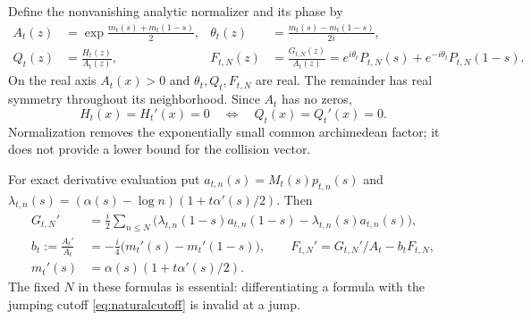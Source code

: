 \documentclass[11pt]{article}
\numberwithin{equation}{section}
\theoremstyle{definition}
\theoremstyle{remark}
\begin{document}
Define the nonvanishing analytic normalizer and its phase by
\begin{align}\label{eq:symmetricnormalization}
 A_t(z)&=\exp\frac{m_t(s)+m_t(1-s)}2,&
 \theta_t(z)&=\frac{m_t(s)-m_t(1-s)}{2i},\\
 Q_t(z)&=\frac{H_t(z)}{A_t(z)},&
 F_{t,N}(z)&=\frac{G_{t,N}(z)}{A_t(z)}
 =e^{i\theta_t}P_{t,N}(s)+e^{-i\theta_t}P_{t,N}(1-s).\nonumber
\end{align}
On the real axis $A_t(x)>0$ and $\theta_t,Q_t,F_{t,N}$ are real.
The remainder has real symmetry throughout its neighborhood. Since
$A_t$ has no zeros,
\begin{equation}\label{eq:collisionnormalized}
 H_t(x)=H_t'(x)=0\quad\Longleftrightarrow\quad Q_t(x)=Q_t'(x)=0.
\end{equation}
Normalization removes the exponentially small common archimedean factor;
it does not provide a lower bound for the collision vector.

For exact derivative evaluation put
$a_{t,n}(s)=M_t(s)p_{t,n}(s)$ and
$\lambda_{t,n}(s)=(\alpha(s)-\log n)(1+t\alpha'(s)/2)$. Then
\begin{align}\label{eq:normalizedderivative}
 G_{t,N}'&=\frac i2\sum_{n\le N}
  \big(\lambda_{t,n}(1-s)a_{t,n}(1-s)
       -\lambda_{t,n}(s)a_{t,n}(s)\big),\\
 b_t:=\frac{A_t'}{A_t}&=-\frac i4\big(m_t'(s)-m_t'(1-s)\big),
 \qquad F_{t,N}'=G_{t,N}'/A_t-b_tF_{t,N},\nonumber\\
 m_t'(s)&=\alpha(s)(1+t\alpha'(s)/2).\nonumber
\end{align}
The fixed $N$ in these formulas is essential: differentiating a formula
with the jumping cutoff \eqref{eq:naturalcutoff} is invalid at a jump.
\end{document}
